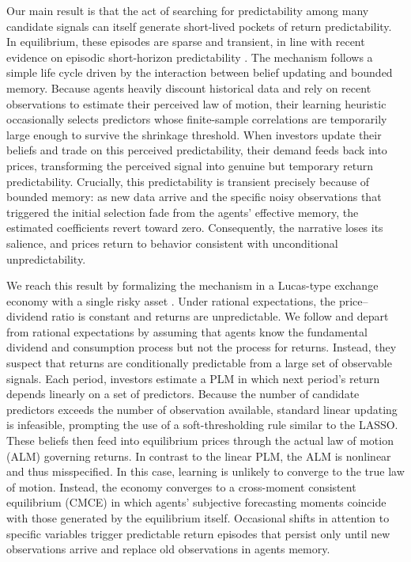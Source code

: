 \documentclass[11pt]{article}
\begin{document}
Our main result is that the act of searching for predictability among many candidate signals can itself generate short-lived pockets of return predictability.
In equilibrium, these episodes are sparse and transient, in line with recent evidence on episodic short-horizon predictability \citep{Chinco2019, Farmer2023}.
The mechanism follows a simple life cycle driven by the interaction between belief updating and bounded memory.
Because agents heavily discount historical data and rely on recent observations to estimate their perceived law of motion, their learning heuristic occasionally selects predictors whose finite-sample correlations are temporarily large enough to survive the shrinkage threshold.
When investors update their beliefs and trade on this perceived predictability, their demand feeds back into prices, transforming the perceived signal into genuine but temporary return predictability.
Crucially, this predictability is transient precisely because of bounded memory: as new data arrive and the specific noisy observations that triggered the initial selection fade from the agents' effective memory, the estimated coefficients revert toward zero.
Consequently, the narrative loses its salience, and prices return to behavior consistent with unconditional unpredictability.

We reach this result by formalizing the mechanism in a Lucas-type exchange economy with a single risky asset \citep{Lucas1978}.
Under rational expectations, the price–dividend ratio is constant and returns are unpredictable.
We follow \citet{Adam2016} and depart from rational expectations by assuming that agents know the fundamental dividend and consumption process but not the process for returns.
Instead, they suspect that returns are conditionally predictable from a large set of observable signals.
Each period, investors estimate a PLM in which next period's return depends linearly on a set of predictors.
Because the number of candidate predictors exceeds the number of observation available, standard linear updating is infeasible, prompting the use of a soft-thresholding rule similar to the LASSO.
These beliefs then feed into equilibrium prices through the actual law of motion (ALM) governing returns.
In contrast to the linear PLM, the ALM is nonlinear and thus misspecified.
In this case, learning is unlikely to converge to the true law of motion.
Instead, the economy converges to a cross-moment consistent equilibrium (CMCE) in which agents' subjective forecasting moments coincide with those generated by the equilibrium itself.
Occasional shifts in attention to specific variables trigger predictable return episodes that persist only until new observations arrive and replace old observations in agents memory.
\end{document}
